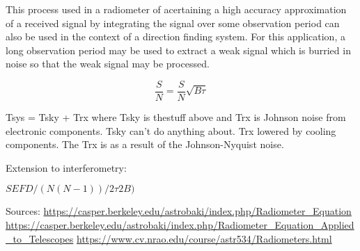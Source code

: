 This process used in a radiometer of acertaining a high accuracy approximation of a received signal by integrating the signal over some observation period can also be used in the context of a direction finding system. For this application, a long observation period may be used to extract a weak signal which is burried in noise so that the weak signal may be processed.

\begin{equation}
  \frac{S}{N} = \frac{S}{N}\sqrt{B\tau}
\end{equation}

Tsys = Tsky + Trx where Tsky is thestuff above and Trx is Johnson noise from electronic components. Tsky can't do anything about. Trx lowered by cooling components. 
The Trx is as a result of the Johnson-Nyquist noise. 

Extension to interferometry:

\(SEFD / (N(N-1))/2 \tau 2B)\)

Sources: \url{https://casper.berkeley.edu/astrobaki/index.php/Radiometer_Equation}
\url{https://casper.berkeley.edu/astrobaki/index.php/Radiometer_Equation_Applied_to_Telescopes}
\url{https://www.cv.nrao.edu/course/astr534/Radiometers.html}
